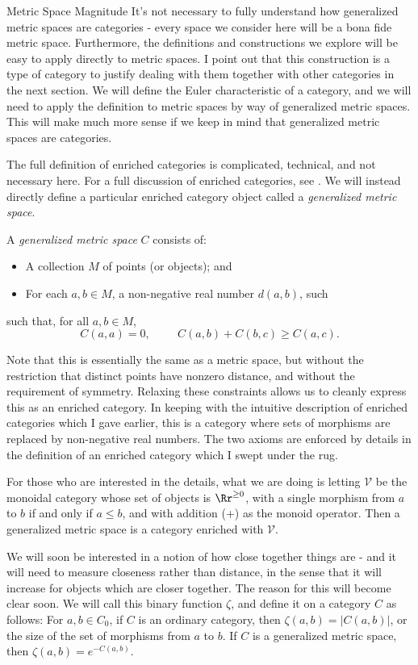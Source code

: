 \documentclass[12pt]{pom_thesis}
\begin{document}
\begin{chapter}{Metric Space Magnitude}
It's not necessary to fully understand how generalized metric spaces are categories - every space we consider here will be a bona fide metric space. Furthermore, the definitions and constructions we explore will be easy to apply directly to metric spaces. I point out that this construction is a type of category to justify dealing with them together with other categories in the next section. We will define the Euler characteristic of a category, and we will need to apply the definition to metric spaces by way of generalized metric spaces. This will make much more sense if we keep in mind that generalized metric spaces are categories.

The full definition of enriched categories is complicated, technical, and not necessary here. For a full discussion of enriched categories, see \cite{Kelly1}. We will instead directly define a particular enriched category object called a \emph{generalized metric space}.
\begin{defn}
A \emph{generalized metric space} $C$ consists of:
\begin{itemize}
\item A collection $M$ of points (or objects); and
\item For each $a,b \in M$, a non-negative real number $d(a,b)$, such
\end{itemize}
such that, for all $a,b \in M$,
\[C(a,a) = 0,\hspace{1cm} C(a,b) + C(b,c) \geq C(a,c).
\]
\end{defn}
Note that this is essentially the same as a metric space, but without the restriction that distinct points have nonzero distance, and without the requirement of symmetry. Relaxing these constraints allows us to cleanly express this as an enriched category. In keeping with the intuitive description of enriched categories which I gave earlier, this is a category where sets of morphisms are replaced by non-negative real numbers. The two axioms are enforced by details in the definition of an enriched category which I swept under the rug.

For those who are interested in the details, what we are doing is letting $\mathcal{V}$ be the monoidal category whose set of objects is $\Rr^{\geq 0}$, with a single morphism from $a$ to $b$ if and only if $a \leq b$, and with addition (+) as the monoid operator. Then a generalized metric space is a category enriched with $\mathcal{V}$. 

We will soon be interested in a notion of how close together things are - and it will need to measure closeness rather than distance, in the sense that it will increase for objects which are closer together. The reason for this will become clear soon. We will call this binary function $\zeta$, and define it on a category $C$ as follows: For $a,b \in C_0$, if $C$ is an ordinary category, then $\zeta(a,b) = |C(a,b)|$, or the size of the set of morphisms from $a$ to $b$. If $C$ is a generalized metric space, then $\zeta(a,b) = e^{-C(a,b)}$. 


\end{chapter}
\end{document}
